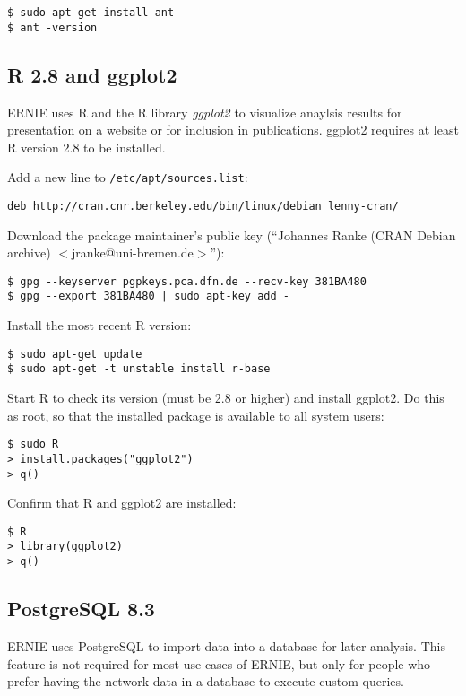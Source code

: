 \documentclass{article}
\begin{document}
\begin{verbatim}
$ sudo apt-get install ant
$ ant -version
\end{verbatim}

\subsection{R 2.8 and ggplot2}

ERNIE uses R and the R library \emph{ggplot2} to visualize anaylsis
results for presentation on a website or for inclusion in publications.
ggplot2 requires at least R version 2.8 to be installed.

Add a new line to \verb+/etc/apt/sources.list+:

\begin{verbatim}
deb http://cran.cnr.berkeley.edu/bin/linux/debian lenny-cran/
\end{verbatim}

Download the package maintainer's public key (``Johannes Ranke (CRAN Debian
archive) $<$jranke@uni-bremen.de$>$''):

\begin{verbatim}
$ gpg --keyserver pgpkeys.pca.dfn.de --recv-key 381BA480
$ gpg --export 381BA480 | sudo apt-key add -
\end{verbatim}

Install the most recent R version:

\begin{verbatim}
$ sudo apt-get update
$ sudo apt-get -t unstable install r-base
\end{verbatim}

Start R to check its version (must be 2.8 or higher) and install ggplot2.
Do this as root, so that the installed package is available to all system
users:

\begin{verbatim}
$ sudo R
> install.packages("ggplot2")
> q()
\end{verbatim}

Confirm that R and ggplot2 are installed:

\begin{verbatim}
$ R
> library(ggplot2)
> q()
\end{verbatim}

\subsection{PostgreSQL 8.3}
\label{sec-install-postgres}

ERNIE uses PostgreSQL to import data into a database for later analysis.
This feature is not required for most use cases of ERNIE, but only for
people who prefer having the network data in a database to execute custom
queries.
\end{document}
